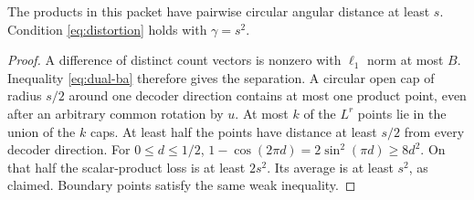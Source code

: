 \begin{lemma}\label{lem:packet-separation}
The products in this packet have pairwise circular angular distance at least $s$. Condition \eqref{eq:distortion} holds with $\gamma=s^2$.
\end{lemma}
\begin{proof}
A difference of distinct count vectors is nonzero with $\ell_1$ norm at most $B$. Inequality \eqref{eq:dual-ba} therefore gives the separation. A circular open cap of radius $s/2$ around one decoder direction contains at most one product point, even after an arbitrary common rotation by $u$. At most $k$ of the $L^r$ points lie in the union of the $k$ caps. At least half the points have distance at least $s/2$ from every decoder direction. For $0\le d\le1/2$,
$1-\cos(2\pi d)=2\sin^2(\pi d)\ge8d^2$.
On that half the scalar-product loss is at least $2s^2$. Its average is at least $s^2$, as claimed. Boundary points satisfy the same weak inequality.
\end{proof}

